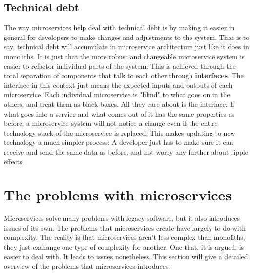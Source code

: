 \subsection{Technical debt}
The way microservices help deal with technical debt is by making it easier in general for developers to make changes and adjustments to the system.
That is to say, technical debt will accumulate in microservice architecture just like it does in monoliths. 
It is just that the more robust and changeable microservice system is easier to refactor individual parts of the system.
This is achieved through the total separation of components that talk to each other through \textbf{interfaces}. 
The interface in this context just means the expected inputs and outputs of each microservice.
Each individual microservice is "blind" to what goes on in the others, and treat them as black boxes.
All they care about is the interface: If what goes into a service and what comes out of it has the same properties as before, a microservice system will not notice a change even if the entire technology stack of the microservice is replaced.
This makes updating to new technology a much simpler process: A developer just has to make sure it can receive and send the same data as before, and not worry any further about ripple effects.

\section{The problems with microservices}
Microservices solve many problems with legacy software, but it also introduces issues of its own. 
The problems that microservices create have largely to do with complexity.
The reality is that microservices aren't less complex than monoliths, they just exchange one type of complexity for another. 
One that, it is argued, is easier to deal with. It leads to issues nonetheless.
This section will give a detailed overview of the problems that microservices introduces.

